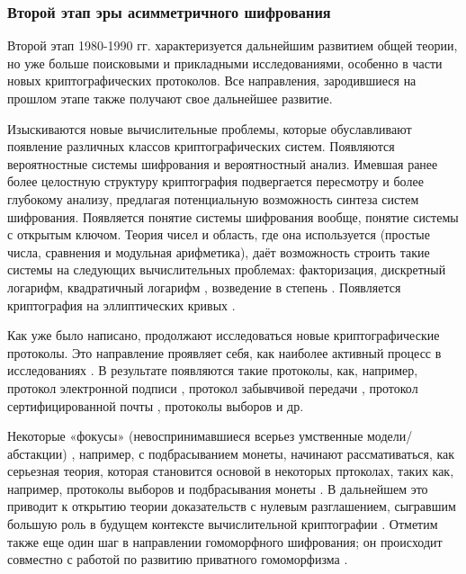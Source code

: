     \subsubsection{Второй этап эры асимметричного шифрования}

     \color{Plum}Второй этап 1980-1990 гг. характеризуется дальнейшим развитием общей теории, но уже больше поисковыми и прикладными исследованиями, особенно в части новых криптографических протоколов. Все направления, зародившиеся на прошлом этапе также получают свое дальнейшее развитие.\par
     \color{Black}Изыскиваются новые вычислительные проблемы, которые обуславливают появление различных классов криптографических систем. Появляются вероятностные системы шифрования и вероятностный анализ. \color{Plum}Имевшая ранее более целостную структуру криптография подвергается пересмотру и более глубокому анализу, предлагая потенциальную возможность синтеза систем шифрования. Появляется понятие системы шифрования вообще, понятие системы с открытым ключом. Теория чисел и область, где она используется (простые числа, сравнения и модульная арифметика), даёт возможность строить такие системы на следующих вычислительных проблемах: факторизация, дискретный логарифм, квадратичный логарифм \cite{LOG-85}, возведение в степень \cite{RSA-78}. Появляется криптография на эллиптических кривых \cite{EllipticCurves-85}.\par
     Как уже было написано, продолжают исследоваться новые криптографические протоколы. Это направление проявляет себя, как наиболее активный процесс в исследованиях \cite[с.315/4]{NewDirsLater-97}. В результате появляются такие протоколы, как, например, протокол электронной подписи \cite{DigSign-79}, протокол забывчивой передачи \cite{ObliviousTransfer-88}, протокол сертифицированной почты \cite{ContractSign-85}, протоколы выборов \cite{ElectionScheme-85} \cite{SecretBallot-87} и др.\par
     Некоторые «фокусы» (невоспринимавшиеся всерьез умственные модели/абстакции) \cite{NewDirsLater-97}, например, с подбрасыванием монеты, начинают рассмативаться, как серьезная теория, которая становится основой в некоторых пртоколах, таких как, например, протоколы выборов и подбрасывания монеты \cite{BSecret-83} \cite{BCoin-82}. В дальнейшем это приводит к открытию теории доказательств с нулевым разглашением, сыгравшим большую роль в будущем контексте  вычислительной криптографии \cite{VerifySecretSharing-87} \cite{ComplexIntercativProofs-89}. Отметим также еще один шаг в направлении гомоморфного шифрования; он происходит совместно с работой по развитию приватного гомоморфизма \cite{OnPrivHomo-87}.\par
